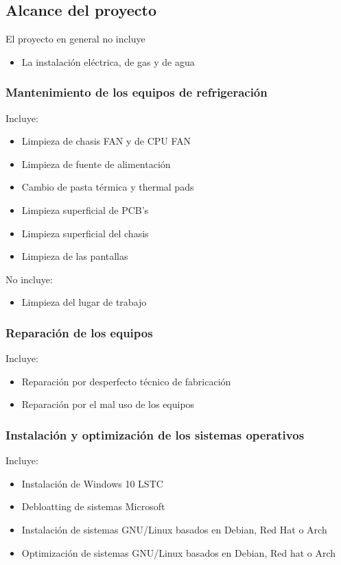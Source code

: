 \documentclass{article}
\begin{document}
	\subsection{Alcance del proyecto}
		El proyecto en general no incluye
		\begin{itemize}
		\item La instalación eléctrica, de gas y de agua
		\end{itemize}
		
		\subsubsection{Mantenimiento de los equipos de refrigeración}
			Incluye:
			\begin{itemize}
			\item Limpieza de chasis FAN y de CPU FAN
			\item Limpieza de fuente de alimentación
			\item Cambio de pasta térmica y thermal pads
			\item Limpieza superficial de PCB's
			\item Limpieza superficial del chasis
			\item Limpieza de las pantallas
			\end{itemize}
			
			No incluye:
			\begin{itemize}
			\item Limpieza del lugar de trabajo
			\end{itemize}
			
		\subsubsection{Reparación de los equipos}
			Incluye:
			\begin{itemize}
			\item Reparación por desperfecto técnico de fabricación
			\item Reparación por el mal uso de los equipos
			\end{itemize}
		
		\subsubsection{Instalación y optimización de los sistemas operativos}
			Incluye:
			\begin{itemize}
			\item Instalación de Windows 10 LSTC
			\item Debloatting de sistemas Microsoft
			\item Instalación de sistemas GNU/Linux basados en Debian, Red Hat o Arch
			\item Optimización de sistemas GNU/Linux basados en Debian, Red hat o Arch
			\end{itemize}
			
\end{document}
